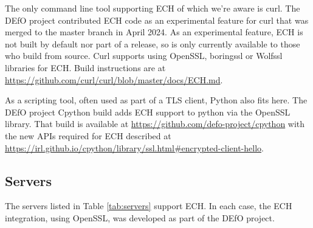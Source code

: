 The only command line tool supporting ECH of which we're aware is curl. The
DEfO project
contributed ECH code as an experimental feature for curl that was merged to the
master branch in April 2024. As an experimental feature, ECH is not built by
default nor part of a release, so is only currently available to those who
build from source. Curl supports using OpenSSL, boringssl or Wolfssl libraries
for ECH.  Build instructions are at
\url{https://github.com/curl/curl/blob/master/docs/ECH.md}.

As a scripting tool, often used as part of a TLS client, Python also fits here.
The DEfO project Cpython build adds ECH support to python via the OpenSSL
library.  That build is available at
\url{https://github.com/defo-project/cpython} with the new APIs required for
ECH described at
\url{https://irl.github.io/cpython/library/ssl.html#encrypted-client-hello}.

\subsection{Servers}

The servers listed in Table \ref{tab:servers} support ECH. In each case,
the ECH integration, using OpenSSL, was developed as part of the DEfO
project.

